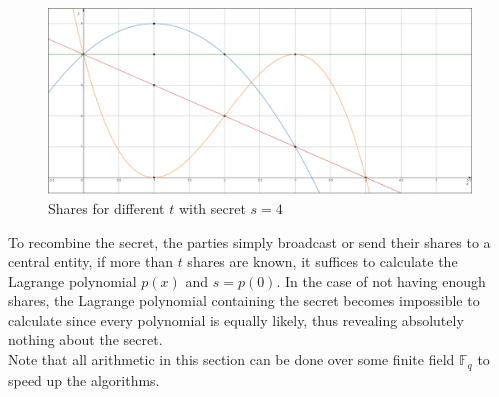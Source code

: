 \begin{figure}
  \includegraphics[width=\linewidth]{plots/secretsharing_big.png}
  \caption{Shares for different $t$ with secret $s=4$}
  \label{fig:secretsharing}
\end{figure}

To recombine the secret, the parties simply broadcast or send their shares to a central entity, if more than $t$ shares are known, it suffices to calculate the Lagrange polynomial $p(x)$ and $s=p(0)$. In the case of not having enough shares, the Lagrange polynomial containing the secret becomes impossible to calculate since every polynomial is equally likely, thus revealing absolutely nothing about the secret.\\

Note that all arithmetic in this section can be done over some finite field $\mathbb{F}_q$ to speed up the algorithms.

